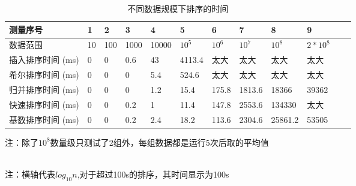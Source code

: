 \documentclass{article}
\begin{document}
\begin{CJK}{UTF8}{gkai}
\begin{table}[!htbp] 
	
	\caption{不同数据规模下排序的时间}
	\begin{flushleft} 
		\begin{tabular}{|l|l|l|l|l|l|l|l|l|l|l|l|} 
			\hline 测量序号 & 1 & 2 & 3 & 4 & 5 & 6 & 7 & 8 & 9\\ 
			\hline 数据范围 &10&100&1000&10000&$10^{5}$&$10^{6}$&$10^7$&$10^{8}$&$2*10^8$ \\ 
			\hline 插入排序时间 (ms)
			&0&0&0.6&43&4113.4&太大&太大&太大&太大  \\
			\hline 希尔排序时间 (ms)
			&0&0&0&5.4&524.6&太大&太大&太大&太大  \\ 
			\hline 归并排序时间 (ms)
			&0&0&0&1.2&15.4&175.8&1813.6&18366&39362  \\ 
			\hline 快速排序时间 (ms)
			&0&0&0.2&1&11.4&147.8&2553.6&134330&太大  \\ 
			\hline 基数排序时间 (ms)
			&0&0&0.2&2.4&18.2&113.6&2304.6&25861.2&53505  \\ 
			\hline
		\end{tabular} 
		注：除了$10^8$数量级只测试了2组外，每组数据都是运行5次后取的平均值
	\end{flushleft} 
\end{table}


\pgfplotsset{}

\\
注：横轴代表$log_{10}{n}$,对于超过100s的排序，其时间显示为100s


\end{CJK}
\end{document}
